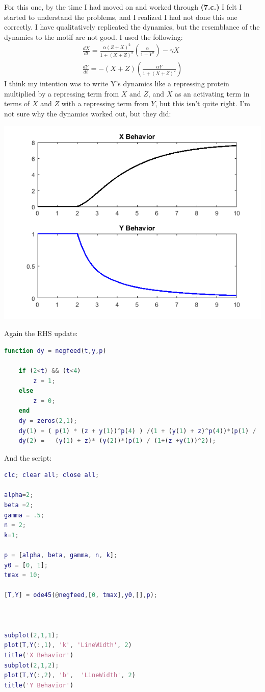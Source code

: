 \documentclass{article}
\begin{document}
For this one, by the time I had moved on and worked through \textbf{(7.c.)} I felt I started to understand the problems, and I realized I had not done this one correctly. I have qualitatively replicated the dynamics, but the resemblance of the dynamics to the motif are not good. I used the following:
\begin{equation}
\begin{aligned}
\frac{dX}{dt} = \frac{\alpha(Z + X)^2}{1+(X+Z)^2}(\frac{\alpha}{1+Y^2}) - \gamma X\\
\frac{dY}{dt} = -(X+Z)(\frac{\alpha Y}{1+(X+Z)^2})
\end{aligned}
\end{equation}
I think my intention was to write Y's dynamics like a repressing protein multiplied by a repressing term from $X$ and $Z$, and $X$ as an activating term in terms of $X$ and $Z$ with a repressing term from $Y$, but this isn't quite right. I'm not sure why the dynamics worked out, but they did:
\begin{center}
    \includegraphics[scale = 1]{7b.png}
\end{center}
Again the RHS update:
\begin{lstlisting}[language=Matlab]
function dy = negfeed(t,y,p)
 
    if (2<t) && (t<4)
        z = 1;
    else
        z = 0;
    end
    dy = zeros(2,1);
    dy(1) = ( p(1) * (z + y(1))^p(4) ) /(1 + (y(1) + z)^p(4))*(p(1) / (1+y(2)^2)) - p(3)*y(1); 
    dy(2) = - (y(1) + z)* (y(2))*(p(1) / (1+(z +y(1))^2));

\end{lstlisting}
And the script:
\begin{lstlisting}[language=Matlab]
clc; clear all; close all;

alpha=2;
beta =2;
gamma = .5;
n = 2;
k=1;

p = [alpha, beta, gamma, n, k];
y0 = [0, 1];
tmax = 10;

[T,Y] = ode45(@negfeed,[0, tmax],y0,[],p);



subplot(2,1,1);
plot(T,Y(:,1), 'k', 'LineWidth', 2)
title('X Behavior')
subplot(2,1,2);
plot(T,Y(:,2), 'b',  'LineWidth', 2)
title('Y Behavior')
\end{lstlisting}
\end{document}
